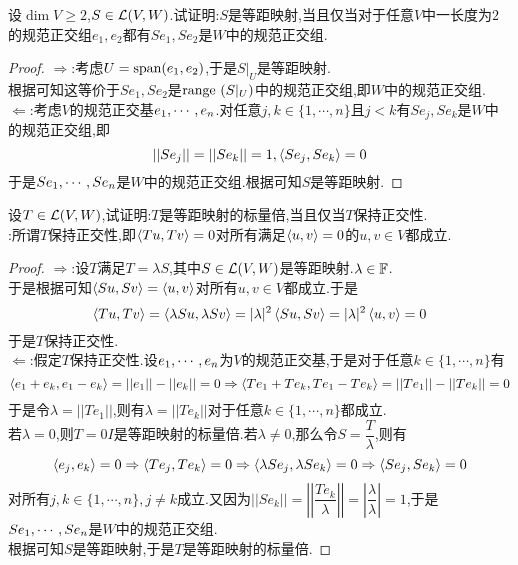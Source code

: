 \documentclass{ctexart}
\begin{document}
\pagestyle{empty}
\begin{center}
    \large{}
\end{center}
\begin{problem}[1.]
    设$\dim V\geqslant2 $,$S\in\mathcal{L}(V,W)$.试证明:$S$是等距映射,当且仅当对于任意$V$中一长度为$2$的规范正交组$e_1,e_2$都有$Se_1,Se_2$是$W$中的规范正交组.
\end{problem}
\begin{proof}
    $\Rightarrow$:考虑$U=\text{span}(e_1,e_2)$,于是$S|_U$是等距映射.\\
    根据可知这等价于$Se_1,Se_2$是$\text{range }(S|_U)$中的规范正交组,即$W$中的规范正交组.\\
    $\Leftarrow$:考虑$V$的规范正交基${e}_1,\cdots,{e}_{n}$.对任意$j,k\in\{1,\cdots,n\}$且$j<k$有$Se_j,Se_k$是$W$中的规范正交组,即
    \[||Se_j||=||Se_k||=1,\left\langle{Se_j},{Se_k}\right\rangle=0\]
    于是${Se}_1,\cdots,{Se}_{n}$是$W$中的规范正交组.根据可知$S$是等距映射.
\end{proof}
\begin{problem}[2.]
    设$T\in\mathcal{L}(V,W)$,试证明:$T$是等距映射的标量倍,当且仅当$T$保持正交性.\\
    :所谓$T$保持正交性,即$\left\langle{Tu},{Tv}\right\rangle=0$对所有满足$\left\langle{u},{v}\right\rangle=0$的$u,v\in V$都成立.
\end{problem}
\begin{proof}
    $\Rightarrow$:设$T$满足$T=\lambda S$,其中$S\in\mathcal{L}(V,W)$是等距映射.$\lambda\in\mathbb{F}$.\\
    于是根据可知$\left\langle{Su},{Sv}\right\rangle=\left\langle{u},{v}\right\rangle$对所有$u,v\in V$都成立.于是
    \[\left\langle{Tu},{Tv}\right\rangle=\left\langle{\lambda Su},{\lambda Sv}\right\rangle=|\lambda|^2\left\langle{Su},{Sv}\right\rangle=|\lambda|^2\left\langle{u},{v}\right\rangle=0\]
    于是$T$保持正交性.\\
    $\Leftarrow$:假定$T$保持正交性.设${e}_1,\cdots,{e}_{n}$为$V$的规范正交基,于是对于任意$k\in\{1,\cdots,n\}$有
    \[\left\langle{e_1+e_k},{e_1-e_k}\right\rangle=||e_1||-||e_k||=0\Rightarrow\left\langle{Te_1+Te_k},{Te_1-Te_k}\right\rangle=||Te_1||-||Te_k||=0\]
    于是令$\lambda=||Te_1||$,则有$\lambda=||Te_k||$对于任意$k\in\{1,\cdots,n\}$都成立.\\
    若$\lambda=0$,则$T=0I$是等距映射的标量倍.若$\lambda\neq0$,那么令$S=\dfrac{T}{\lambda}$,则有
    \[\left\langle{e_j},{e_k}\right\rangle=0\Rightarrow\left\langle{Te_j},{Te_k}\right\rangle=0\Rightarrow\left\langle{\lambda Se_j},{\lambda Se_k}\right\rangle=0\Rightarrow\left\langle{Se_j},{Se_k}\right\rangle=0\]
    对所有$j,k\in\{1,\cdots,n\},j\neq k$成立.又因为$||Se_k||=\left|\left|\dfrac{Te_k}{\lambda}\right|\right|=\left|\dfrac{\lambda}{\lambda}\right|=1$,于是${Se}_1,\cdots,{Se}_{n}$是$W$中的规范正交组.\\
    根据可知$S$是等距映射,于是$T$是等距映射的标量倍.
\end{proof}
\end{document}
